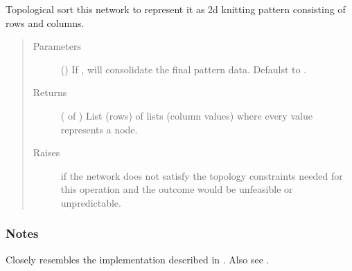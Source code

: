 \documentclass[letterpaper,10pt,english]{sphinxmanual}
\begin{document}
\begin{fulllineitems}
\begin{fulllineitems}
\label{\detokenize{cockatoo:cockatoo.KnitDiNetwork.make_pattern_data}}
Topological sort this network to represent it as 2d knitting pattern
consisting of rows and columns.
\begin{quote}\begin{description}
\item[{Parameters}] \leavevmode
{} () \textendash{} If , will consolidate the final pattern data.
Defaulst to .

\item[{Returns}] \leavevmode
{} ( of ) \textendash{} List (rows) of lists (column values) where every value represents
a node.

\item[{Raises}] \leavevmode
{\hyperref[\detokenize{cockatoo:cockatoo.exception.KnitNetworkTopologyError}]{}} \textendash{} if the network does not satisfy the topology constraints needed for
    this operation and the outcome would be unfeasible or
    unpredictable.

\end{description}\end{quote}
\subsubsection*{Notes}

Closely resembles the implementation described in  \sphinxfootnotemark[1]. Also see
 \sphinxfootnotemark[2].

\end{fulllineitems}



\end{fulllineitems}
\end{document}
